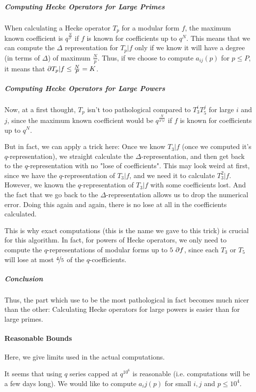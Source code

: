 \subparagraph{Computing Hecke Operators for Large Primes}
When calculating a Hecke operator $T_p$ for a modular form $f$, the maximum known coefficient is $q^{\frac{N}{p}}$ if $f$ is known for coefficients up to $q^{N}$.
This means that we can compute the $\Delta$ representation for $T_p|f$ only if we know it will have a degree (in terms of $\Delta$) of maximum $\frac{N}{p}$.
Thus, if we choose to compute $a_{ij}(p)$ for $p \leq P$, it means that $\partial T_p|f \leq \frac{N}{P} = K$.

\subparagraph{Computing Hecke Operators for Large Powers}
Now, at a first thought, $T_p$ isn't too pathological compared to $T_3^iT_5^j$ for large $i$ and $j$, since the maximum known coefficient would be $q^{\frac{N}{3^i5^j}}$ if $f$ is known for coefficients up to $q^{N}$.

But in fact, we can apply a trick here:
Once we know $T_3|f$ (once we computed it's $q$-representation), we straight calculate the $\Delta$-representation, and then get back to the $q$-representation with no "lose of coefficients".
This may look weird at first, since we have the $q$-representation of $T_3|f$, and we need it to calculate $T_3^2|f$.
However, we known the $q$-representation of $T_3|f$ with some coefficients lost.
And the fact that we go back to the $\Delta$-representation allows us to drop the numerical error.
Doing this again and again, there is no lose at all in the coefficients calculated.

This is why exact computations (this is the name we gave to this trick) is crucial for this algorithm.
In fact, for powers of Hecke operators, we only need to compute the $q$-representations of modular forms up to $5 \ \degree{f}$, since each $T_3$ or $T_5$ will lose at most $\nicefrac{4}{5}$ of the $q$-coefficients.

\subparagraph{Conclusion}
Thus, the part which use to be the most pathological in fact becomes much nicer than the other: Calculating Hecke operators for large powers is easier than for large primes.

\paragraph{Reasonable Bounds}
Here, we give limits used in the actual computations.

It seems that using $q$ series capped at $q^{10^6}$ is reasonable (i.e. computations will be a few days long).
We would like to compute $a_ij(p)$ for small $i,j$ and $p \leq 10^4$.

